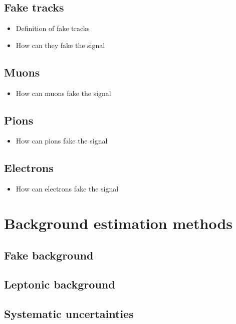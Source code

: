 \subsection{Fake tracks}
\begin{itemize}
\item Definition of fake tracks
\item How can they fake the signal
\end{itemize}
\subsection{Muons}
\begin{itemize}
\item How can muons fake the signal
\end{itemize}
\subsection{Pions}
\begin{itemize}
\item How can pions fake the signal
\end{itemize}
\subsection{Electrons}
\begin{itemize}
\item How can electrons fake the signal
\end{itemize}
\section{Background estimation methods}
\label{sec:BackgroundEstimation}
\subsection{Fake background}
\subsection{Leptonic background}
\subsection{Systematic uncertainties}

